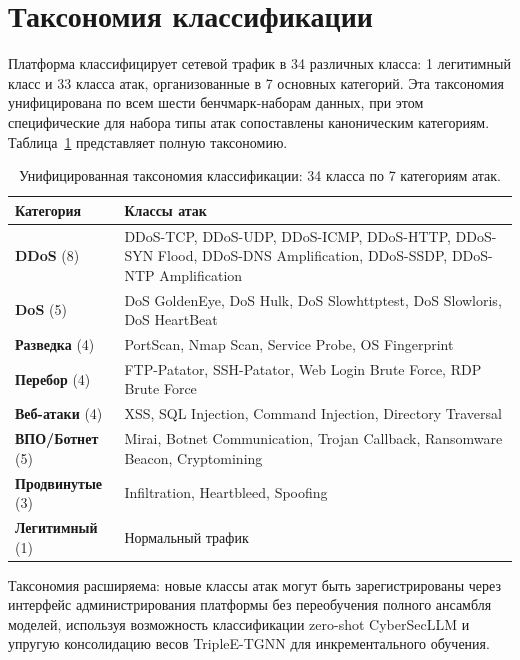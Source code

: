 \section{Таксономия классификации}
\label{sec:taxonomy}

Платформа классифицирует сетевой трафик в 34 различных класса: 1 легитимный класс и 33 класса атак, организованные в 7 основных категорий. Эта таксономия унифицирована по всем шести бенчмарк-наборам данных, при этом специфические для набора типы атак сопоставлены каноническим категориям. Таблица~\ref{tab:taxonomy} представляет полную таксономию.

\begin{table}[htbp]
\centering
\caption{Унифицированная таксономия классификации: 34 класса по 7 категориям атак.}
\label{tab:taxonomy}
\small
\begin{tabular}{p{2.5cm} p{10.5cm}}
\toprule
\textbf{Категория} & \textbf{Классы атак} \\
\midrule
\textbf{DDoS} (8) & DDoS-TCP, DDoS-UDP, DDoS-ICMP, DDoS-HTTP, DDoS-SYN Flood, DDoS-DNS Amplification, DDoS-SSDP, DDoS-NTP Amplification \\
\addlinespace
\textbf{DoS} (5) & DoS GoldenEye, DoS Hulk, DoS Slowhttptest, DoS Slowloris, DoS HeartBeat \\
\addlinespace
\textbf{Разведка} (4) & PortScan, Nmap Scan, Service Probe, OS Fingerprint \\
\addlinespace
\textbf{Перебор} (4) & FTP-Patator, SSH-Patator, Web Login Brute Force, RDP Brute Force \\
\addlinespace
\textbf{Веб-атаки} (4) & XSS, SQL Injection, Command Injection, Directory Traversal \\
\addlinespace
\textbf{ВПО/Ботнет} (5) & Mirai, Botnet Communication, Trojan Callback, Ransomware Beacon, Cryptomining \\
\addlinespace
\textbf{Продвинутые} (3) & Infiltration, Heartbleed, Spoofing \\
\addlinespace
\textbf{Легитимный} (1) & Нормальный трафик \\
\bottomrule
\end{tabular}
\end{table}

Таксономия расширяема: новые классы атак могут быть зарегистрированы через интерфейс администрирования платформы без переобучения полного ансамбля моделей, используя возможность классификации zero-shot CyberSecLLM и упругую консолидацию весов TripleE-TGNN для инкрементального обучения.


